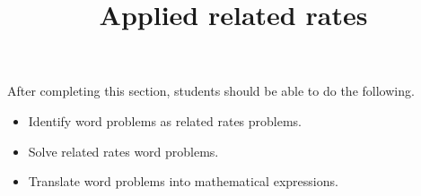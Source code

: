 \documentclass{ximera}
\title{Applied related rates}
\begin{document}
\begin{abstract}
\end{abstract}

\maketitle

\begin{sectionOutcomes}

After completing this section, students should be able to do the following.

\begin{itemize}
\item Identify word problems as related rates problems.
\item Solve related rates word problems.
\item Translate word problems into mathematical expressions.
\end{itemize}

\end{sectionOutcomes}
\end{document}
